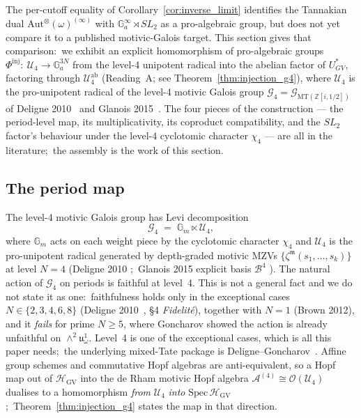 \documentclass[11pt,a4paper]{article}
\theoremstyle{plain}
\theoremstyle{definition}
\newcommand{\HGV}{\mathcal{H}_{\mathrm{GV}}}
\newcommand{\Aut}{\mathrm{Aut}}
\newcommand{\Ga}{\mathbb{G}_{a}}
\newcommand{\Gm}{\mathbb{G}_{m}}
\newcommand{\Z}{\mathbb{Z}}
\newcommand{\Ustar}{U^{*}}
\newcommand{\fibfun}{\omega}
\begin{document}
The per-cutoff equality of Corollary~\ref{cor:inverse_limit} identifies
the Tannakian dual $\Aut^{\otimes}(\fibfun)^{(\infty)}$ with
$\Ga^{\infty} \rtimes SL_{2}$ as a pro-algebraic group, but does not
yet compare it to a published motivic-Galois target. This section
gives that comparison:\ we
exhibit an explicit homomorphism of pro-algebraic groups
$\Phi^{\mathrm{inj}}:\ \mathcal{U}_{4} \rightarrow \Ga^{3N}$ from the
level-4 unipotent radical into the abelian factor of $\Ustar_{GV}$,
factoring through $\mathcal{U}_{4}^{\mathrm{ab}}$ (Reading~A; see
Theorem~\ref{thm:injection_g4}), where $\mathcal{U}_{4}$
is the pro-unipotent radical of the level-4 motivic Galois group
$\mathcal{G}_{4} = \mathcal{G}_{\mathrm{MT}(\Z[i, 1/2])}$ of
Deligne 2010~\cite{deligne2010} and Glanois
2015~\cite{glanois2015}. The four pieces of the construction --- the
period-level map, its multiplicativity, its coproduct compatibility,
and the $SL_{2}$ factor's behaviour under the level-4 cyclotomic
character $\chi_{4}$ --- are all in the literature;\ the assembly is
the work of this section.

\subsection{The period map}\label{sec:period_map}

The level-4 motivic Galois group has Levi decomposition
\[
   \mathcal{G}_{4} \;=\; \Gm \ltimes \mathcal{U}_{4},
\]
where $\Gm$ acts on each weight piece by the cyclotomic character
$\chi_{4}$ and $\mathcal{U}_{4}$ is the pro-unipotent radical
generated by depth-graded motivic MZVs $\{\zeta^{\mathfrak{m}}(s_{1},
\ldots, s_{k})\}$ at level $N = 4$ (Deligne 2010
\cite{deligne2010};\ Glanois 2015 explicit basis $\mathcal{B}^{4}$
\cite{glanois2015}). The natural action of $\mathcal{G}_{4}$ on
periods is faithful at level~4.  This is not a general fact and we do not
state it as one:\ faithfulness holds only in the exceptional cases
$N \in \{2,3,4,6,8\}$ (Deligne 2010~\cite{deligne2010}, \S4 \emph{Fidelit\'e}), together
with $N=1$ (Brown 2012), and it \emph{fails} for prime $N \ge 5$, where
Goncharov showed the action is already unfaithful on $\wedge^{2}\mathfrak{u}^{1}_{\omega}$.
Level~4 is one of the exceptional cases, which is all this paper needs;\ the
underlying mixed-Tate package is Deligne--Goncharov~\cite{goncharov_deligne2005}.  Affine
group schemes and commutative Hopf algebras are anti-equivalent, so a Hopf
map out of $\HGV$ into the de Rham motivic Hopf algebra
$\mathcal{A}^{(4)} \cong \mathcal{O}(\mathcal{U}_{4})$ dualises to a
homomorphism \emph{from} $\mathcal{U}_{4}$ \emph{into}
$\mathrm{Spec}\,\HGV$;\ Theorem~\ref{thm:injection_g4} states the map in
that direction.
\end{document}
